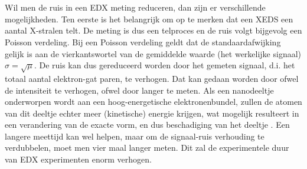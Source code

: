\documentclass{report}
\begin{document}
\\ \\
Wil men de ruis in een EDX meting reduceren, dan zijn er verschillende mogelijkheden. Ten eerste is het belangrijk om op te merken dat een XEDS een aantal X-stralen telt. De meting is dus een telproces en de ruis volgt bijgevolg een Poisson verdeling. Bij een Poisson verdeling geldt dat de standaardafwijking gelijk is aan de vierkantswortel van de gemiddelde waarde (het werkelijke signaal) $\sigma = \sqrt{\mu}$. De ruis kan dus gereduceerd worden door het gemeten signaal, d.i. het totaal aantal elektron-gat paren, te verhogen. Dat kan gedaan worden door ofwel de intensiteit te verhogen, ofwel door langer te meten. Als een nanodeeltje onderworpen wordt aan een hoog-energetische elektronenbundel, zullen de atomen van dit deeltje echter meer (kinetische) energie krijgen, wat mogelijk resulteert in een verandering van de exacte vorm, en dus beschadiging van het deeltje \cite{book:williamscarter}. Een langere meettijd kan wel helpen, maar om de signaal-ruis verhouding te verdubbelen, moet men vier maal langer meten. Dit zal de experimentele duur van EDX experimenten enorm verhogen.
\end{document}
